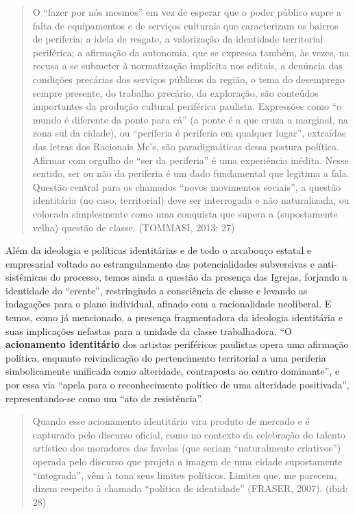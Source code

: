 \begin{quote}
O ``fazer por nós mesmos'' em vez de esperar que o poder público supre a
falta de equipamentos e de serviços culturais que caracterizam os
bairros de periferia; a ideia de resgate, a valorização da identidade
territorial periférica; a afirmação da autonomia, que se expressa
também, às vezes, na recusa a se submeter à normatização implícita nos
editais, a denúncia das condições precárias dos serviços públicos da
região, o tema do desemprego sempre presente, do trabalho precário, da
exploração, são conteúdos importantes da produção cultural periférica
paulista. Expressões como ``o mundo é diferente da ponte para cá'' (a
ponte é a que cruza a marginal, na zona sul da cidade), ou ``periferia é
periferia em qualquer lugar'', extraídas das letras dos Racionais Mc's,
são paradigmáticas dessa postura política. Afirmar com orgulho de ``ser
da periferia'' é uma experiência inédita. Nesse sentido, ser ou não da
periferia é um dado fundamental que legitima a fala. Questão central
para os chamados ``novos movimentos sociais'', a questão identitária (no
caso, territorial) deve ser interrogada e não naturalizada, ou colocada
simplesmente como uma conquista que supera a (supostamente velha)
questão de classe. (TOMMASI, 2013: 27)
\end{quote}

Além da ideologia e políticas identitárias e de todo o arcabouço estatal
e empresarial voltado ao estrangulamento das potencialidades subversivas
e anti-sistêmicas do processo, temos ainda a questão da presença das
Igrejas, forjando a identidade do ``crente'', restringindo a consciência
de classe e levando as indagações para o plano individual, afinado com a
racionalidade neoliberal. E temos, como já mencionado, a presença
fragmentadora da ideologia identitária e suas implicações nefastas para
a unidade da classe trabalhadora. ``O \textbf{acionamento identitário}
dos artistas periféricos paulistas opera uma afirmação política,
enquanto reivindicação do pertencimento territorial a uma periferia
simbolicamente unificada como alteridade, contraposta ao centro
dominante'', e por essa via ``apela para o reconhecimento político de
uma alteridade positivada'', representando-se como um ``ato de
resistência''.

\begin{quote}
Quando esse acionamento identitário vira produto de mercado e é
capturado pelo discurso oficial, como no contexto da celebração do
talento artístico dos moradores das favelas (que seriam ``naturalmente
criativos'') operada pelo discurso que projeta a imagem de uma cidade
supostamente ``integrada'', vêm à tona seus limites políticos. Limites
que, me parecem, dizem respeito à chamada ``política de identidade''
(FRASER, 2007). (ibid: 28)
\end{quote}

